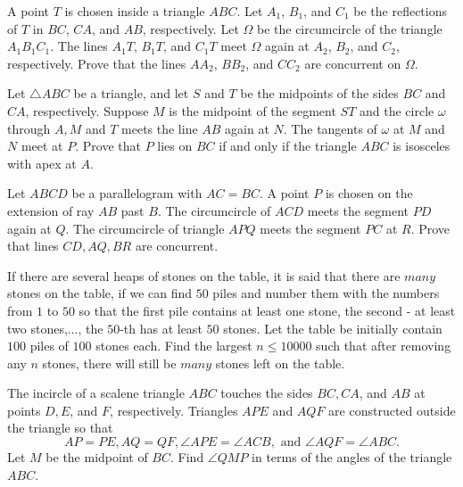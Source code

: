 \documentclass[11pt]{scrartcl}
\begin{document}
\begin{problem}[2918584823978789760]
A point $T$ is chosen inside a triangle $ABC$. Let $A_1$, $B_1$, and $C_1$ be the reflections of $T$ in $BC$, $CA$, and $AB$, respectively. Let $\Omega$ be the circumcircle of the triangle $A_1B_1C_1$. The lines $A_1T$, $B_1T$, and $C_1T$ meet $\Omega$ again at $A_2$, $B_2$, and $C_2$, respectively. Prove that the lines $AA_2$, $BB_2$, and $CC_2$ are concurrent on $\Omega$.
\end{problem}
\begin{problem}[8639636622304457736]
Let $\triangle ABC$ be a triangle, and let $S$ and $T$ be the midpoints of the sides $BC$ and $CA$, respectively. Suppose $M$ is the midpoint of the segment $ST$ and the circle $\omega$ through $A, M$ and $T$ meets the line $AB$ again at $N$. The tangents of $\omega$ at $M$ and $N$ meet at $P$. Prove that $P$ lies on $BC$ if and only if the triangle $ABC$ is isosceles with apex at $A$.
\end{problem}
\begin{problem}[682786464566571]
Let $ABCD$ be a parallelogram with $AC=BC.$ A point $P$ is chosen on the extension of ray $AB$ past $B.$ The circumcircle of $ACD$ meets the segment $PD$ again at $Q.$ The circumcircle of triangle $APQ$ meets the segment $PC$ at $R.$ Prove that lines $CD,AQ,BR$ are concurrent.
\end{problem}
\begin{problem}[6955756846906975678]
If there are several heaps of stones on the table, it is said that there are $\textit{many}$ stones on the table, if we can find $50$ piles and number them with the numbers from $1$ to $50$ so that the first pile contains at least one stone, the second - at least two stones,..., the $50$-th has at least $50$ stones. Let the table be initially contain $100$ piles of $100$ stones each. Find the largest $n \leq 10 000$ such that after removing any $n$ stones, there will still be $\textit{many}$ stones left on the table.
\end{problem}
\begin{problem}[221552874820768]
The incircle of a scalene triangle $ABC$ touches the sides $BC, CA$, and $AB$ at points $D, E$, and $F$, respectively. Triangles $APE$ and $AQF$ are constructed outside the triangle so that\[AP =PE, AQ=QF, \angle APE=\angle ACB,\text{ and }\angle AQF =\angle ABC.\]Let $M$ be the midpoint of $BC$. Find $\angle QMP$ in terms of the angles of the triangle $ABC$.
\end{problem}
\end{document}
